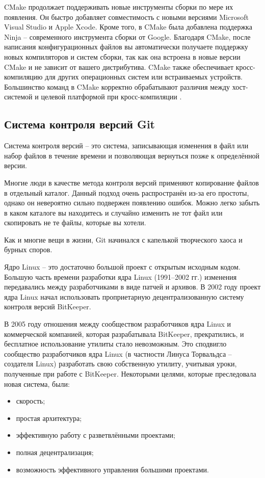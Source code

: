 CMake продолжает поддерживать новые инструменты сборки по мере их появления. Он быстро добавляет совместимость с новыми версиями Microsoft Visual Studio и Apple Xcode. Кроме того, в CMake была добавлена поддержка Ninja -- современного инструмента сборки от Google. Благодаря CMake, после написания конфигурационных файлов вы автоматически получаете поддержку новых компиляторов и систем сборки, так как она встроена в новые версии CMake и не зависит от вашего дистрибутива. CMake также обеспечивает кросс-компиляцию для других операционных систем или встраиваемых устройств. Большинство команд в CMake корректно обрабатывают различия между хост-системой и целевой платформой при кросс-компиляции \cite{CMake}.

\subsection{Система контроля версий Git}

Система контроля версий -- это система, записывающая изменения в файл или набор файлов в течение времени и позволяющая вернуться позже к определённой версии.

Многие люди в качестве метода контроля версий применяют копирование файлов в
отдельный каталог. Данный подход очень распространён из-за его простоты, однако он невероятно сильно подвержен появлению ошибок. Можно легко забыть в каком каталоге вы находитесь и случайно изменить не тот файл или скопировать не те файлы, которые вы хотели.

Как и многие вещи в жизни, Git начинался с капелькой творческого хаоса и бурных споров.

Ядро Linux -- это достаточно большой проект с открытым исходным кодом. Большую часть времени разработки ядра Linux (1991–2002 гг.) изменения передавались между разработчиками в виде патчей и архивов. В 2002 году проект ядра Linux начал использовать проприетарную децентрализованную систему контроля версий BitKeeper.

В 2005 году отношения между сообществом разработчиков ядра Linux и коммерческой компанией, которая разрабатывала BitKeeper, прекратились, и бесплатное использование утилиты стало невозможным. Это сподвигло сообщество разработчиков ядра Linux (в частности Линуса Торвальдса -- создателя Linux) разработать свою собственную утилиту, учитывая уроки, полученные при работе с BitKeeper. Некоторыми целями, которые преследовала новая система, были:
\begin{itemize}
	\item скорость;
	\item простая архитектура;
	\item эффективную работу с разветвлёнными проектами;
	\item полная децентрализация;
	\item возможность эффективного управления большими проектами.
\end{itemize}

